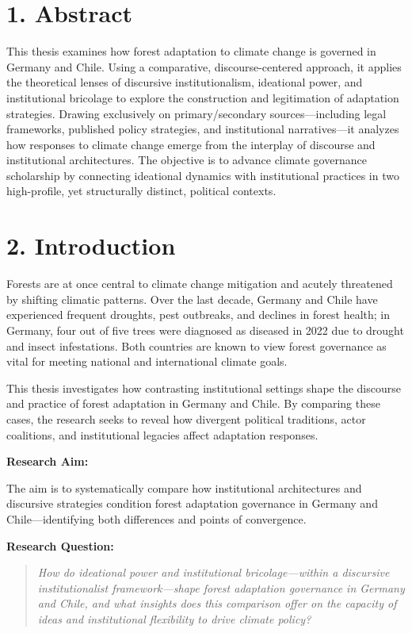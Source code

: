 
\section*{1. Abstract}

This thesis examines how forest adaptation to climate change is governed in Germany and Chile. Using a comparative, discourse-centered approach, it applies the theoretical lenses of discursive institutionalism, ideational power, and institutional bricolage to explore the construction and legitimation of adaptation strategies. Drawing exclusively on primary/secondary sources---including legal frameworks, published policy strategies, and institutional narratives---it analyzes how responses to climate change emerge from the interplay of discourse and institutional architectures. The objective is to advance climate governance scholarship by connecting ideational dynamics with institutional practices in two high-profile, yet structurally distinct, political contexts.

\section*{2. Introduction}

Forests are at once central to climate change mitigation and acutely threatened by shifting climatic patterns. Over the last decade, Germany and Chile have experienced frequent droughts, pest outbreaks, and declines in forest health; in Germany, four out of five trees were diagnosed as diseased in 2022 due to drought and insect infestations. Both countries are known to view forest governance as vital for meeting national and international climate goals.

This thesis investigates how contrasting institutional settings shape the discourse and practice of forest adaptation in Germany and Chile. By comparing these cases, the research seeks to reveal how divergent political traditions, actor coalitions, and institutional legacies affect adaptation responses. 

\textbf{Research Aim:}

The aim is to systematically compare how institutional architectures and discursive strategies condition forest adaptation governance in Germany and Chile---identifying both differences and points of convergence.

\textbf{Research Question:}

\begin{quote}
\textit{How do ideational power and institutional bricolage---within a discursive institutionalist framework---shape forest adaptation governance in Germany and Chile, and what insights does this comparison offer on the capacity of ideas and institutional flexibility to drive climate policy?}
\end{quote}

